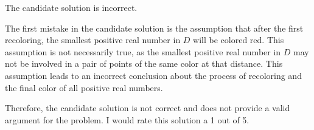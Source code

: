 The candidate solution is incorrect.

The first mistake in the candidate solution is the assumption that after the first recoloring, the smallest positive real number in $D$ will be colored red. This assumption is not necessarily true, as the smallest positive real number in $D$ may not be involved in a pair of points of the same color at that distance. This assumption leads to an incorrect conclusion about the process of recoloring and the final color of all positive real numbers.

Therefore, the candidate solution is not correct and does not provide a valid argument for the problem. I would rate this solution a 1 out of 5.

